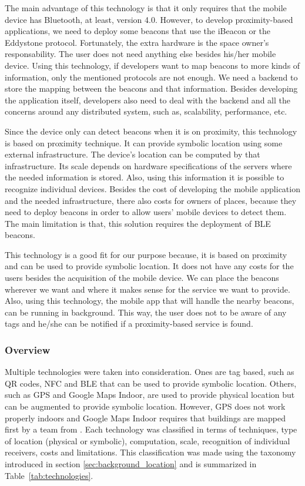 The main advantage of this technology is that it only requires that the mobile device has Bluetooth, at least, version 4.0.
However, to develop proximity-based applications, we need to deploy some beacons that use the iBeacon or the Eddystone protocol.
Fortunately, the extra hardware is the space owner's responsability.
The user does not need anything else besides his/her mobile device.
Using this technology, if developers want to map beacons to more kinds of information, only the mentioned protocols are not enough.
We need a backend to store the mapping between the beacons and that information.
Besides developing the application itself, developers also need to deal with the backend and all the concerns around any distributed system, such as, scalability, performance, etc.

Since the device only can detect beacons when it is on proximity, this technology is based on proximity technique.
It can provide symbolic location using some external infrastructure.
The device's location can be computed by that infrastructure.
Its scale depends on hardware specifications of the servers where the needed information is stored.
Also, using this information it is possible to recognize individual devices.
Besides the cost of developing the mobile application and the needed infrastructure, there also costs for owners of places, because they need to deploy beacons in order to allow users' mobile devices to detect them.
The main limitation is that, this solution requires the deployment of \gls{BLE} beacons.

This technology is a good fit for our purpose because, it is based on proximity and can be used to provide symbolic location.
It does not have any costs for the users besides the acquisition of the mobile device.
We can place the beacons wherever we want and where it makes sense for the service we want to provide.
Also, using this technology, the mobile app that will handle the nearby beacons, can be running in background.
This way, the user does not to be aware of any tags and he/she can be notified if a proximity-based service is found.

\subsubsection{Overview}
\label{sub:background_overview}
Multiple technologies were taken into consideration.
Ones are tag based, such as \gls{QR} codes, \gls{NFC} and \gls{BLE} that can be used to provide symbolic location.
Others, such as \gls{GPS} and Google Maps Indoor, are used to provide physical location but can be augmented to provide symbolic location.
However, \gls{GPS} does not work properly indoors and Google Maps Indoor requires that buildings are mapped first by a team from .
Each technology was classified in terms of techniques, type of location (physical or symbolic), computation, scale, recognition of individual receivers, costs and limitations.
This classification was made using the taxonomy introduced in section \ref{sec:background_location} and is summarized in Table~\ref{tab:technologies}.

